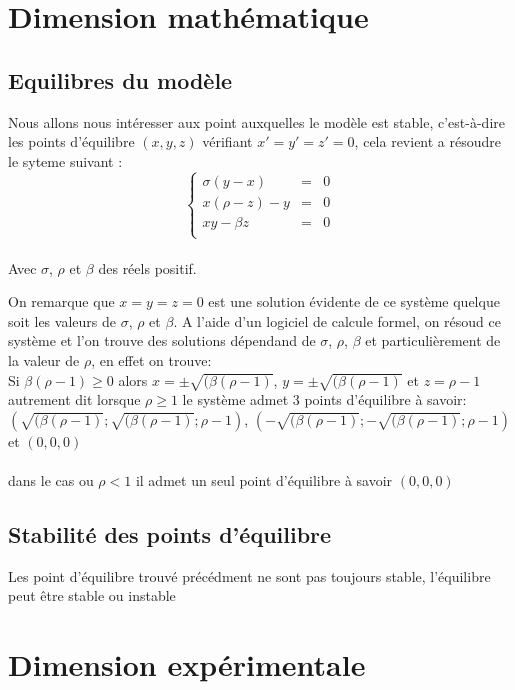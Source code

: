 \section{Dimension mathématique}

\subsection{Equilibres du modèle}
Nous allons nous intéresser aux point auxquelles le modèle est stable, c’est-à-dire les points d’équilibre $(x,y,z)$ vérifiant $x'=y'=z'=0$, cela revient a résoudre le syteme suivant :\\
\[
    \left\{
    \begin{array}{rcl}
        \sigma(y-x)&=&0\\
        x(\rho-z)-y&=&0\\
        xy-\beta z&=&0\\
    \end{array}
    \right.
\]\\

Avec $\sigma$, $\rho$ et $\beta$ des réels positif.

On remarque que $x=y=z=0$ est une solution évidente de ce système quelque soit les valeurs de $\sigma$, $\rho$ et $\beta$.
A l'aide d'un logiciel de calcule formel, on résoud ce système et l'on trouve des solutions dépendand de $\sigma$, $\rho$, $\beta$ et particulièrement de la valeur de $\rho$, en effet on trouve:\\

Si $\beta(\rho-1)\geq 0$ alors $x= \pm \sqrt{(\beta(\rho-1)}$, $y= \pm \sqrt{(\beta(\rho-1)}$ et $z=\rho-1$\\
autrement dit lorsque $\rho\geq 1$ le système admet 3 points d'équilibre à savoir:\\
 $(\sqrt{(\beta(\rho-1)}; \sqrt{(\beta(\rho-1)}; \rho-1)$, $(-\sqrt{(\beta(\rho-1)}; -\sqrt{(\beta(\rho-1)}; \rho-1)$ et $(0,0,0)$\\\\
 dans le cas ou $\rho < 1$ il admet un seul point d'équilibre à savoir $(0,0,0)$\\
 
 \subsection{Stabilité des points d'équilibre}
Les point d'équilibre trouvé précédment ne sont pas toujours stable, l'équilibre peut être stable ou instable
\section{Dimension expérimentale}